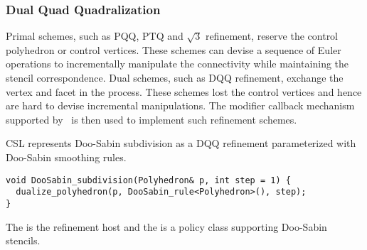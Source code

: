 \subsubsection{Dual Quad Quadralization}
Primal schemes, such as PQQ, PTQ and $\sqrt{3}$ refinement,
reserve the control polyhedron or control vertices.
These schemes can devise a sequence of Euler operations
to incrementally manipulate the connectivity while 
maintaining the stencil correspondence.
Dual schemes, such as DQQ refinement, exchange the 
vertex and facet in the process. These schemes lost
the control vertices and hence are hard to 
devise incremental manipulations. The modifier callback 
mechanism supported by \cgalpoly\ is then used to 
implement such refinement schemes.

CSL represents Doo-Sabin subdivision as a DQQ refinement 
parameterized with Doo-Sabin smoothing rules.
\begin{lstlisting}
void DooSabin_subdivision(Polyhedron& p, int step = 1) {
  dualize_polyhedron(p, DooSabin_rule<Polyhedron>(), step);
}
\end{lstlisting}
The  is the refinement host and the
 is a policy class supporting 
Doo-Sabin stencils.
\\

